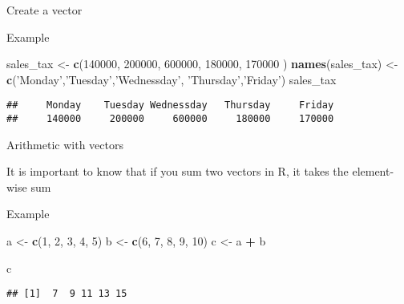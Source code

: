 \documentclass[ignorenonframetext,]{beamer}
\newenvironment{Shaded}{\begin{snugshade}}{\end{snugshade}}
\newcommand{\KeywordTok}[1]{\textcolor[rgb]{0.13,0.29,0.53}{\textbf{#1}}}
\newcommand{\DecValTok}[1]{\textcolor[rgb]{0.00,0.00,0.81}{#1}}
\newcommand{\StringTok}[1]{\textcolor[rgb]{0.31,0.60,0.02}{#1}}
\newcommand{\OperatorTok}[1]{\textcolor[rgb]{0.81,0.36,0.00}{\textbf{#1}}}
\newcommand{\NormalTok}[1]{#1}
\begin{document}
\begin{frame}[fragile]{Create a vector}

\begin{block}{Example}

\begin{Shaded}
\begin{Highlighting}[]
\NormalTok{sales_tax <-}\StringTok{ }\KeywordTok{c}\NormalTok{(}\DecValTok{140000}\NormalTok{, }\DecValTok{200000}\NormalTok{, }\DecValTok{600000}\NormalTok{, }\DecValTok{180000}\NormalTok{, }\DecValTok{170000}\NormalTok{ )}
\KeywordTok{names}\NormalTok{(sales_tax) <-}\StringTok{ }\KeywordTok{c}\NormalTok{(}\StringTok{'Monday'}\NormalTok{,}\StringTok{'Tuesday'}\NormalTok{,}\StringTok{'Wednessday'}\NormalTok{,}
                      \StringTok{'Thursday'}\NormalTok{,}\StringTok{'Friday'}\NormalTok{)}
\NormalTok{sales_tax}
\end{Highlighting}
\end{Shaded}

\begin{verbatim}
##     Monday    Tuesday Wednessday   Thursday     Friday 
##     140000     200000     600000     180000     170000
\end{verbatim}

\end{block}

\end{frame}

\begin{frame}[fragile]{Arithmetic with vectors}

It is important to know that if you sum two vectors in R, it takes the
element-wise sum

\begin{block}{Example}

\begin{Shaded}
\begin{Highlighting}[]
\NormalTok{a <-}\StringTok{ }\KeywordTok{c}\NormalTok{(}\DecValTok{1}\NormalTok{, }\DecValTok{2}\NormalTok{, }\DecValTok{3}\NormalTok{, }\DecValTok{4}\NormalTok{, }\DecValTok{5}\NormalTok{)}
\NormalTok{b <-}\StringTok{ }\KeywordTok{c}\NormalTok{(}\DecValTok{6}\NormalTok{, }\DecValTok{7}\NormalTok{, }\DecValTok{8}\NormalTok{, }\DecValTok{9}\NormalTok{, }\DecValTok{10}\NormalTok{)}
\NormalTok{c <-}\StringTok{ }\NormalTok{a }\OperatorTok{+}\StringTok{ }\NormalTok{b}
\end{Highlighting}
\end{Shaded}

\begin{Shaded}
\begin{Highlighting}[]
\NormalTok{c}
\end{Highlighting}
\end{Shaded}

\begin{verbatim}
## [1]  7  9 11 13 15
\end{verbatim}

\end{block}

\end{frame}
\end{document}
